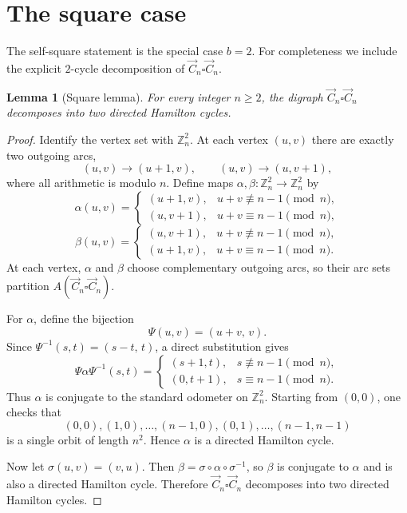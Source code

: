 \documentclass[11pt]{article}
\newtheorem{lemma}[theorem]{Lemma}
\newcommand{\Cdir}{\vec C}
\begin{document}
\section{The square case}

The self-square statement is the special case $b=2$.
For completeness we include the explicit $2$-cycle decomposition of
$\Cdir_n\square\Cdir_n$.

\begin{lemma}[Square lemma]\label{lem:square}
For every integer $n\ge 2$, the digraph $\Cdir_n\square\Cdir_n$ decomposes into
two directed Hamilton cycles.
\end{lemma}

\begin{proof}
Identify the vertex set with $\mathbb Z_n^2$.
At each vertex $(u,v)$ there are exactly two outgoing arcs,
\[
(u,v)\to(u+1,v),
\qquad
(u,v)\to(u,v+1),
\]
where all arithmetic is modulo $n$.
Define maps $\alpha,\beta:\mathbb Z_n^2\to\mathbb Z_n^2$ by
\[
\alpha(u,v)=
\begin{cases}
(u+1,v), & u+v\not\equiv n-1 \pmod n,\\[2mm]
(u,v+1), & u+v\equiv n-1 \pmod n,
\end{cases}
\]
\[
\beta(u,v)=
\begin{cases}
(u,v+1), & u+v\not\equiv n-1 \pmod n,\\[2mm]
(u+1,v), & u+v\equiv n-1 \pmod n.
\end{cases}
\]
At each vertex, $\alpha$ and $\beta$ choose complementary outgoing arcs, so
their arc sets partition $A(\Cdir_n\square\Cdir_n)$.

For $\alpha$, define the bijection
\[
\Psi(u,v)=(u+v,\,v).
\]
Since $\Psi^{-1}(s,t)=(s-t,\,t)$, a direct substitution gives
\[
\Psi\alpha\Psi^{-1}(s,t)=
\begin{cases}
(s+1,t), & s\not\equiv n-1 \pmod n,\\[2mm]
(0,t+1), & s\equiv n-1 \pmod n.
\end{cases}
\]
Thus $\alpha$ is conjugate to the standard odometer on $\mathbb Z_n^2$.
Starting from $(0,0)$, one checks that
\[
(0,0), (1,0), \dots, (n-1,0), (0,1), \dots, (n-1,n-1)
\]
is a single orbit of length $n^2$.
Hence $\alpha$ is a directed Hamilton cycle.

Now let $\sigma(u,v)=(v,u)$.
Then $\beta=\sigma\circ\alpha\circ\sigma^{-1}$, so $\beta$ is conjugate to
$\alpha$ and is also a directed Hamilton cycle.
Therefore $\Cdir_n\square\Cdir_n$ decomposes into two directed Hamilton cycles.
\end{proof}
\end{document}

